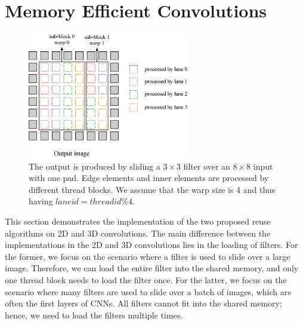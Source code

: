 \section{Memory Efficient Convolutions}
\begin{figure}
	\centering
	\includegraphics[width=0.9\columnwidth,height=5.5cm]{./figure/overalldesign.eps}
\caption{The output is produced by sliding a $3 \times 3$ filter over an $8 \times 8$ input with one pad. Edge elements and inner elements are processed by different thread blocks. We assume that the warp size is 4 and thus having $laneid=threadid\%4$.}
\label{fig:overalldesign}
\end{figure}


This section demonstrates the implementation of the two proposed reuse algorithms on 2D and 3D convolutions. The main difference between the
implementations in the 2D and 3D convolutions lies in the loading of filters. For the former, we focus on the scenario where a filter is used to
slide over a large image. Therefore, we can load the entire filter into the shared memory, and only one thread block needs to load the
filter once. For the latter, we focus on the scenario where many filters are used to slide over a batch of images, which are often the
first layers of CNNs. All filters cannot fit into the shared memory; hence, we need to load the filters multiple times.


